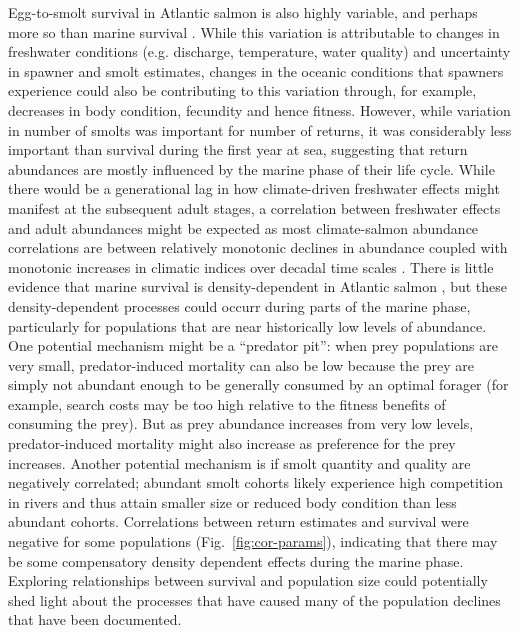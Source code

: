 \documentclass[12pt]{article}
\begin{document}
Egg-to-smolt survival in Atlantic salmon is also highly variable, and perhaps more so
than marine survival \citep{Klemetsen2003,Chaput2015}.
While this variation is attributable to changes in freshwater
conditions (e.g. discharge, temperature, water quality) and uncertainty in
spawner and smolt estimates,
changes in the oceanic conditions that spawners experience could also be
contributing to this variation through, for example, decreases in body condition, fecundity and hence fitness.
However, while variation in number of smolts was
important for number of returns, it was considerably less important than
survival during the first year at sea, suggesting that return abundances
are mostly influenced by the marine phase of their life cycle.
While there would be a generational lag in how climate-driven freshwater effects
might manifest at the subsequent adult stages,
a correlation between freshwater effects and adult abundances might be expected
as most climate-salmon abundance correlations are between relatively monotonic declines
in abundance coupled with monotonic increases in climatic indices
over decadal time scales \citep[e.g.,][]{Friedland1998, Todd2008, Beaugrand2012}.
There is little evidence that marine survival is density-dependent in
Atlantic salmon \citep{Jonsson1998,Gibson2006}, but these
density-dependent processes could occurr during parts of the marine phase,
particularly for populations that are
near historically low levels of abundance. One potential mechanism might be a
``predator pit'': when prey populations are very small, predator-induced
mortality can also be low because the prey are simply not abundant enough to
be generally consumed by an optimal forager (for example, search costs may be
too high relative to the fitness benefits of consuming the prey). But as prey
abundance increases from very low levels, predator-induced mortality might
also increase as preference for the prey increases.
Another potential mechanism is if smolt quantity and quality are negatively
correlated; abundant smolt cohorts likely experience high competition in rivers and thus
attain smaller size or reduced body condition than less abundant cohorts.
Correlations between return estimates and survival were negative for
some populations (Fig.~\ref{fig:cor-params}),
indicating that there may be some compensatory density dependent effects during the
marine phase.
Exploring relationships between survival and population size could potentially
shed light about the processes that have caused many of the population
declines that have been documented.
\end{document}
